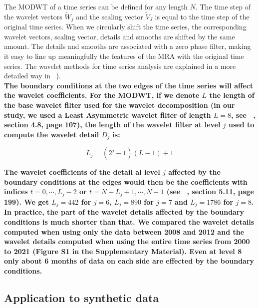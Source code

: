 \documentclass{article}
\begin{document}
The MODWT of a time series can be defined for any length $N$. The time step of the wavelet vectors $\widetilde{W}_j$ and the scaling vector $\widetilde{V}_J$ is equal to the time step of the original time series. When we circularly shift the time series, the corresponding wavelet vectors, scaling vector, details and smooths are shifted by the same amount. The details and smooths are associated with a zero phase filter, making it easy to line up meaningfully the features of the MRA with the original time series. The wavelet methods for time series analysis are explained in a more detailed way in ~\citep{PER_2000}). \\

\textbf{The boundary conditions at the two edges of the time series will affect the wavelet coefficients. For the MODWT, if we denote $L$ the length of the base wavelet filter used for the wavelet decomposition (in our study, we used a Least Asymmetric wavelet filter of length $L = 8$, see ~\citep{PER_2000}, section 4.8, page 107), the length of the wavelet filter at level $j$ used to compute the wavelet detail $D_j$ is:}

\begin{equation*}
L_j = \left( 2^j - 1 \right) \left( L - 1 \right) + 1
\end{equation*}

\textbf{The wavelet coefficients of the detail al level $j$ affected by the boundary conditions at the edges would then be the coefficients with indices $t = 0 , \cdots , L_j - 2$ or $t = N - L_j + 1 , \cdots, N - 1$ (see ~\citep{PER_2000}, section 5.11, page 199). We get $L_j = 442$ for $j = 6$, $L_j = 890$ for $j = 7$ and $L_j = 1786$ for $j = 8$. In practice, the part of the wavelet details affected by the boundary conditions is much shorter than that. We compared the wavelet details computed when using only the data between 2008 and 2012 and the wavelet details computed when using the entire time series from 2000 to 2021 (Figure S1 in the Supplementary Material). Even at level 8 only about 6 months of data on each side are effected by the boundary conditions.}

\subsection{Application to synthetic data}
\end{document}
